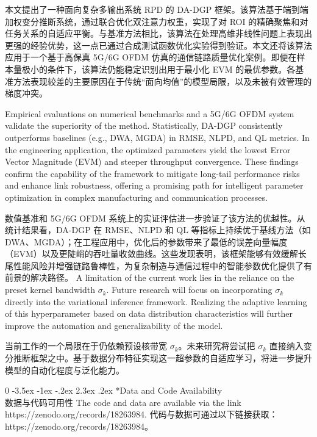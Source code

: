 \documentclass[11pt]{article}
\makeatletter
\newcommand{\blind}{0}
\renewcommand\section{\@startsection {section}{1}{\z@}%
                                       {-3.5ex \@plus -1ex \@minus -.2ex}%
                                       {2.3ex \@plus.2ex}%
                                       {\normalfont\fontfamily{phv}\fontsize{16}{19}\bfseries}}
\makeatother
\begin{document}
本文提出了一种面向复杂多输出系统 RPD 的 DA-DGP 框架。该算法基于端到端加权变分推断系统，通过联合优化双注意力权重，实现了对 ROI 的精确聚焦和对任务关系的自适应平衡。与基准方法相比，该算法在处理高维非线性问题上表现出更强的经验优势，这一点已通过合成测试函数优化实验得到验证。本文还将该算法应用于一个基于高保真 5G/6G OFDM 仿真的通信链路质量优化案例。即便在样本量极小的条件下，该算法仍能稳定识别出用于最小化 EVM 的最优参数。各基准方法表现较差的主要原因在于传统“面向均值”的模型局限，以及未被有效管理的梯度冲突。

Empirical evaluations on numerical benchmarks and a 5G/6G OFDM system validate the superiority of the method. Statistically, DA-DGP consistently outperforms baselines (e.g., DWA, MGDA) in RMSE, NLPD, and QL metrics. In the engineering application, the optimized parameters yield the lowest Error Vector Magnitude (EVM) and steeper throughput convergence. These findings confirm the capability of the framework to mitigate long-tail performance risks and enhance link robustness, offering a promising path for intelligent parameter optimization in complex manufacturing and communication processes. 

数值基准和 5G/6G OFDM 系统上的实证评估进一步验证了该方法的优越性。从统计结果看，DA-DGP 在 RMSE、NLPD 和 QL 等指标上持续优于基线方法（如 DWA、MGDA）；在工程应用中，优化后的参数带来了最低的误差向量幅度（EVM）以及更陡峭的吞吐量收敛曲线。这些发现表明，该框架能够有效缓解长尾性能风险并增强链路鲁棒性，为复杂制造与通信过程中的智能参数优化提供了有前景的解决路径。
A limitation of the current work lies in the reliance on the preset kernel bandwidth $\sigma_{k}$. Future research will focus on incorporating $\sigma_{k}$ directly into the variational inference framework. Realizing the adaptive learning of this hyperparameter based on data distribution characteristics will further improve the automation and generalizability of the model.

当前工作的一个局限在于仍依赖预设核带宽 $\sigma_{k}$。未来研究将尝试把 $\sigma_{k}$ 直接纳入变分推断框架之中。基于数据分布特征实现这一超参数的自适应学习，将进一步提升模型的自动化程度与泛化能力。




\blind{
\section*{Data and Code Availability\\数据与代码可用性}
The code and data are available via the link https://zenodo.org/records/18263984.
代码与数据可通过以下链接获取：https://zenodo.org/records/18263984。
} \fi


%




	
\end{document}
